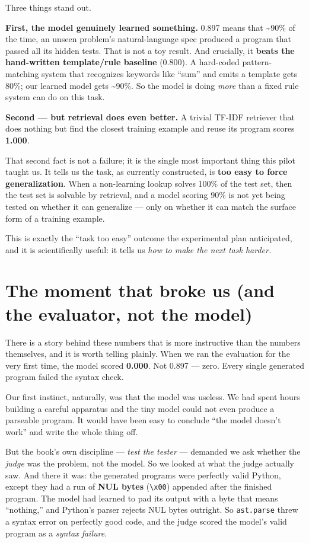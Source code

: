 Three things stand out.

\textbf{First, the model genuinely learned something.} 0.897 means that
\textasciitilde90\% of the time, an unseen problem's natural-language
spec produced a program that passed all its hidden tests. That is not a
toy result. And crucially, it \textbf{beats the hand-written
template/rule baseline} (0.800). A hard-coded pattern-matching system
that recognizes keywords like ``sum'' and emits a template gets 80\%;
our learned model gets \textasciitilde90\%. So the model is doing
\emph{more} than a fixed rule system can do on this task.

\textbf{Second --- but retrieval does even better.} A trivial TF-IDF
retriever that does nothing but find the closest training example and
reuse its program scores \textbf{1.000}.

That second fact is not a failure; it is the single most important thing
this pilot taught us. It tells us the task, as currently constructed, is
\textbf{too easy to force generalization}. When a non-learning lookup
solves 100\% of the test set, then the test set is solvable by
retrieval, and a model scoring 90\% is not yet being tested on whether
it can generalize --- only on whether it can match the surface form of a
training example.

This is exactly the ``task too easy'' outcome the experimental plan
anticipated, and it is scientifically useful: it tells us \emph{how to
make the next task harder.}

\section{The moment that broke us (and the evaluator, not the
model)}\label{the-moment-that-broke-us-and-the-evaluator-not-the-model}

There is a story behind these numbers that is more instructive than the
numbers themselves, and it is worth telling plainly. When we ran the
evaluation for the very first time, the model scored \textbf{0.000}. Not
0.897 --- zero. Every single generated program failed the syntax check.

Our first instinct, naturally, was that the model was useless. We had
spent hours building a careful apparatus and the tiny model could not
even produce a parseable program. It would have been easy to conclude
``the model doesn't work'' and write the whole thing off.

But the book's own discipline --- \emph{test the tester} --- demanded we
ask whether the \emph{judge} was the problem, not the model. So we
looked at what the judge actually saw. And there it was: the generated
programs were perfectly valid Python, except they had a run of
\textbf{NUL bytes} (\texttt{\textbackslash{}x00}) appended after the
finished program. The model had learned to pad its output with a byte
that means ``nothing,'' and Python's parser rejects NUL bytes outright.
So \texttt{ast.parse} threw a syntax error on perfectly good code, and
the judge scored the model's valid program as a \emph{syntax failure}.

